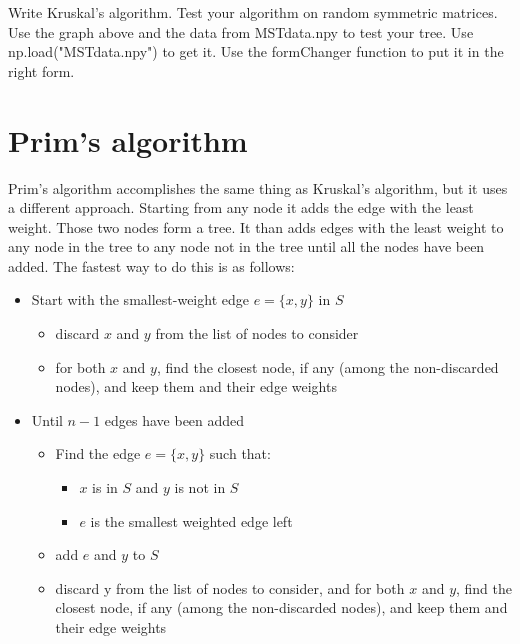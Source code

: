 \begin{problem}
Write Kruskal's algorithm.
Test your algorithm on random symmetric matrices.
Use the graph above and the data from MSTdata.npy to test your tree.
Use np.load("MSTdata.npy") to get it.
Use the formChanger function to put it in the right form.
\end{problem}

\section*{Prim's algorithm}

Prim's algorithm accomplishes the same thing as Kruskal's algorithm, but it uses a different approach.
Starting from any node it adds the edge with the least weight.
Those two nodes form a tree.
It than adds edges with the least weight to any node in the tree to any node not in the tree until all the nodes have been added.
The fastest way to do this is as follows:

\begin{itemize}


\item Start with the smallest-weight edge $e = \{x, y\}$ in $S$

\begin{itemize}

\item discard $x$ and $y$ from the list of nodes to consider

\item for both $x$ and $y$, find the closest node, if any (among the non-discarded nodes), and keep them and their edge weights

\end{itemize}

\item Until $n-1$ edges have been added

\begin{itemize}

\item Find the edge $e = \{x, y\}$ such that:

\begin{itemize}

\item $x$ is in $S$ and $y$ is not in $S$

\item $e$ is the smallest weighted edge left

\end{itemize}

\item add $e$ and $y$ to $S$

\item discard y from the list of nodes to consider, and for both $x$ and $y$, find the closest node, if any (among the non-discarded nodes), and keep them and their edge weights

\end{itemize}

\end{itemize}

